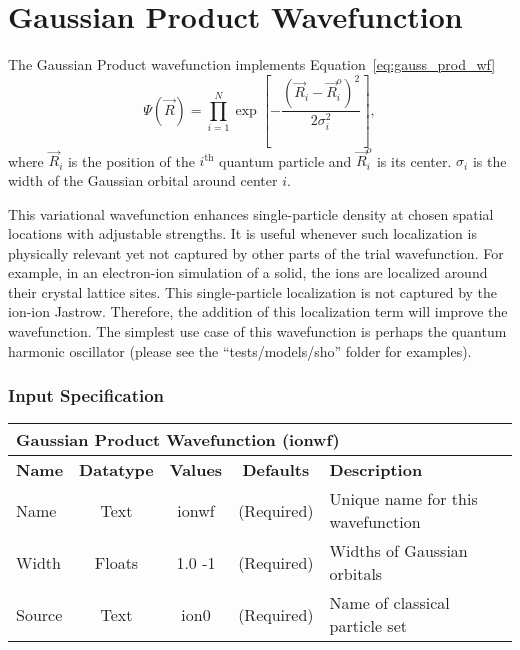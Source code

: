 \section{Gaussian Product Wavefunction}
\label{sec:ionwf}

The Gaussian Product wavefunction implements Equation~\ref{eq:gauss_prod_wf}
\begin{equation}
\Psi(\vec{R}) = \prod_{i=1}^N \exp\left[ -\frac{(\vec{R}_i-\vec{R}_i^o)^2}{2\sigma_i^2} \right]
\label{eq:gauss_prod_wf},
\end{equation}
where $\vec{R}_i$ is the position of the $i^{\text{th}}$ quantum particle and $\vec{R}_i^o$ is its center. $\sigma_i$ is the width of the Gaussian orbital around center $i$.

This variational wavefunction enhances single-particle density at chosen spatial locations with adjustable strengths. It is useful whenever such localization is physically relevant yet not captured by other parts of the trial wavefunction. For example, in an electron-ion simulation of a solid, the ions are localized around their crystal lattice sites. This single-particle localization is not captured by the ion-ion Jastrow. Therefore, the addition of this localization term will improve the wavefunction. The simplest use case of this wavefunction is perhaps the quantum harmonic oscillator (please see the ``tests/models/sho'' folder for examples).

\subsubsection{Input Specification}

\begin{table}[h]
\begin{center}
\begin{tabular}{l c c c l }
\hline
\multicolumn{5}{l}{Gaussian Product Wavefunction (ionwf)} \\
\hline
\bfseries Name & \bfseries Datatype & \bfseries Values & \bfseries Defaults  & \bfseries Description \\
\hline
Name & Text & ionwf & (Required) & Unique name for this wavefunction \\
Width & Floats & 1.0 -1 & (Required) & Widths of Gaussian orbitals\\ 
Source & Text & ion0 & (Required) & Name of classical particle set\\ 
\hline
\end{tabular}
\end{center}
\end{table}


